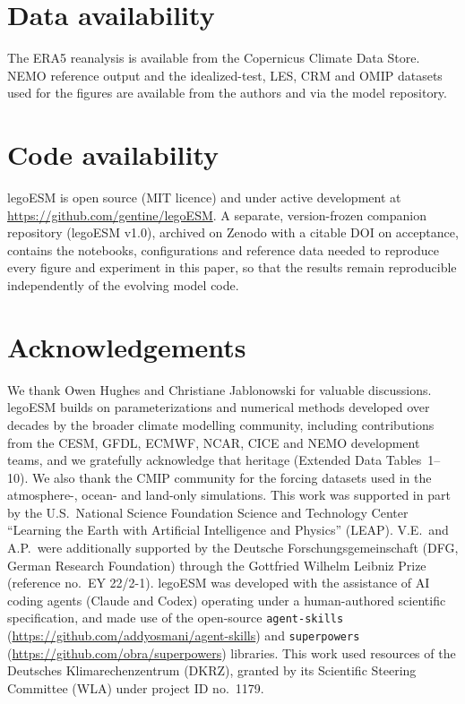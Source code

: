 \documentclass[11pt]{article}
\newcommand{\repourl}{https://github.com/gentine/legoESM}
\begin{document}
\normalsize

\section*{Data availability}
The ERA5 reanalysis is available from the Copernicus Climate Data Store. NEMO reference output and
the idealized-test, LES, CRM and OMIP datasets used for the figures are available from the authors
and via the model repository.

\section*{Code availability}
legoESM is open source (MIT licence) and under active development at \url{\repourl}. A separate,
version-frozen companion repository (legoESM v1.0), archived on Zenodo with a citable DOI on acceptance,
contains the notebooks, configurations and reference data needed to reproduce every figure and
experiment in this paper, so that the results remain reproducible independently of the evolving
model code.

\section*{Acknowledgements}
We thank Owen Hughes and Christiane Jablonowski for valuable discussions. legoESM builds on
parameterizations and numerical methods developed over decades by the broader climate modelling
community, including contributions from the CESM, GFDL, ECMWF, NCAR, CICE and NEMO development
teams, and we gratefully acknowledge that heritage (Extended Data Tables~1--10). We also thank
the CMIP community for the forcing datasets used in the atmosphere-, ocean- and land-only
simulations. This work was supported in part by the U.S.\ National Science Foundation Science and
Technology Center ``Learning the Earth with Artificial Intelligence and Physics'' (LEAP).
V.E.\ and A.P.\ were additionally supported by the Deutsche
Forschungsgemeinschaft (DFG, German Research Foundation) through the Gottfried Wilhelm Leibniz
Prize (reference no.\ EY 22/2-1). legoESM was developed with the assistance of AI coding agents
(Claude and Codex) operating under a human-authored scientific specification, and made use of
the open-source \texttt{agent-skills} (\url{https://github.com/addyosmani/agent-skills}) and
\texttt{superpowers} (\url{https://github.com/obra/superpowers}) libraries. This work used
resources of the Deutsches Klimarechenzentrum (DKRZ), granted by its Scientific Steering
Committee (WLA) under project ID no.\ 1179.
\end{document}

